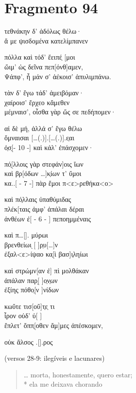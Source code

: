{\pagebreak
\section{Fragmento 94}

\begin{gkverse}
τεθνάκην δ’ ἀδόλως θέλω·\\
ἄ με ψισδομένα κατελίμπανεν

πόλλα καὶ τόδ’ ἔειπέ̣ [μοι\\
ὤιμ’ ὠς δεῖνα πεπ[όνθ]αμεν,\\
Ψάπφ’, ἦ μάν σ’ ἀέκοισ’ ἀπυλιμπάνω.

τὰν δ’ ἔγω τάδ’ ἀμειβόμαν·\\
χαίροισ’ ἔρχεο κἄμεθεν\\
μέμναισ’, οἶσθα γὰρ ὤς σε πεδήπομεν·

αἰ δὲ μή, ἀλλά σ’ ἔγω θέλω\\
ὄμναισαι [\ldots{}(.)].[\ldots{}(.)].ε̣αι\\
ὀ̣σ̣[\qquad     - 10 -\qquad   ] καὶ κάλ’ ἐπάσχομεν·

πό̣[λλοις γὰρ στεφάν]οις ἴων\\
καὶ βρ[όδων \ldots{}]κ̣ίων τ’ ὔμοι\\
κα..[ - 7 -\quad   ] πὰρ ἔμοι π<ε>ρεθήκα<ο>

καὶ πό̣λλαις ὐπαθύμιδας\\
πλέκ[ταις ἀμφ’ ἀπάλαι δέραι\\
ἀνθέων ἐ[  -  6  -  ] πεποημμέναις

καὶ π\ldots{}[\qquad      ]. μύρωι\\
βρενθείωι ̣[      ]ρ̣υ[\ldots{}]ν\\
ἐξαλ<ε>ίψαο κα̣[ὶ βασ]ι̣ληίωι

καὶ στρώμν[αν ἐ] πὶ μολθάκαν\\
ἀπάλαν παρ[̣ \quad   ]ο̣ν̣ων\\ 
ἐξίης πόθο̣[ν \quad    ]νίδων

κωὔτε τισ[\quad       οὔ]τ̣ε̣ τι\\
ἶρον οὐδ’ ὐ[ \quad        ]\\
ἔπλετ’ ὄππ̣[οθεν ἄμ]μες ἀπέσκομεν,

οὐκ ἄλσος .[\qquad	       ].ρος

\textnormal{(versos 28-9: ilegíveis e lacunares)}
\end{gkverse}

\pagebreak

\begin{verse}
\ldots{} morta, honestamente, quero estar;\\*
ela me deixava chorando


\end{verse}}
